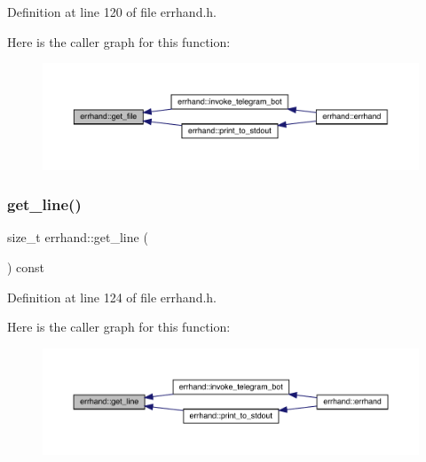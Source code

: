 Definition at line 120 of file errhand.\+h.

Here is the caller graph for this function\+:\nopagebreak
\begin{figure}[H]
\begin{center}
\leavevmode
\includegraphics[width=350pt]{classerrhand_a1556ee8d0aaefeea3bbab73f7ae50914_icgraph}
\end{center}
\end{figure}
\mbox{\label{classerrhand_a258f97d84476b21efc38827cda3e5889}} 
\subsubsection{\texorpdfstring{get\+\_\+line()}{get\_line()}}
{\footnotesize\ttfamily size\+\_\+t errhand\+::get\+\_\+line (\begin{DoxyParamCaption}{ }\end{DoxyParamCaption}) const\hspace{0.3cm}{\ttfamily [inline]}}



Definition at line 124 of file errhand.\+h.

Here is the caller graph for this function\+:\nopagebreak
\begin{figure}[H]
\begin{center}
\leavevmode
\includegraphics[width=350pt]{classerrhand_a258f97d84476b21efc38827cda3e5889_icgraph}
\end{center}
\end{figure}
\mbox{\label{classerrhand_a524dfc6821f703329d8801dd3298f33f}} 
